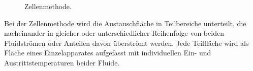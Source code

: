 \begin{figure}[htb]
\caption{Zellenmethode.}
\label{fig:Zellenmethode}
\end{figure}

Bei der Zellenmethode wird die Austauschfläche in Teilbereiche unterteilt, die nacheinander in gleicher oder unterschiedlicher Reihenfolge von beiden Fluidströmen oder Anteilen davon überströmt werden. Jede Teilfläche wird als Fläche eines Einzelapparates aufgefasst mit individuellen Ein- und Austrittstemperaturen beider Fluide. 






